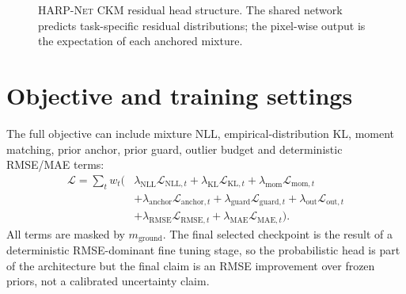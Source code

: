 \begin{figure}[htbp]
\centering
{}
\caption{\textsc{HARP-Net CKM} residual head structure. The shared network predicts
task-specific residual distributions; the pixel-wise output is the expectation
of each anchored mixture.}
\label{fig:try80_arch}
\end{figure}

\section{Objective and training settings}
\label{sec:try80_objective}

The full objective can include mixture NLL, empirical-distribution KL,
moment matching, prior anchor, prior guard, outlier budget and deterministic
RMSE/MAE terms:
\begin{equation}
\begin{aligned}
\mathcal{L}
=\sum_t w_t(&
\lambda_{\mathrm{NLL}}\mathcal{L}_{\mathrm{NLL},t}
+\lambda_{\mathrm{KL}}\mathcal{L}_{\mathrm{KL},t}
+\lambda_{\mathrm{mom}}\mathcal{L}_{\mathrm{mom},t}\\
&+\lambda_{\mathrm{anchor}}\mathcal{L}_{\mathrm{anchor},t}
+\lambda_{\mathrm{guard}}\mathcal{L}_{\mathrm{guard},t}
+\lambda_{\mathrm{out}}\mathcal{L}_{\mathrm{out},t}\\
&+\lambda_{\mathrm{RMSE}}\mathcal{L}_{\mathrm{RMSE},t}
+\lambda_{\mathrm{MAE}}\mathcal{L}_{\mathrm{MAE},t}).
\end{aligned}
\label{eq:try80_total_loss}
\end{equation}
All terms are masked by \(m_{\mathrm{ground}}\). The final selected checkpoint
is the result of a deterministic RMSE-dominant fine tuning stage, so the
probabilistic head is part of the architecture but the final claim is an RMSE
improvement over frozen priors, not a calibrated uncertainty claim.


